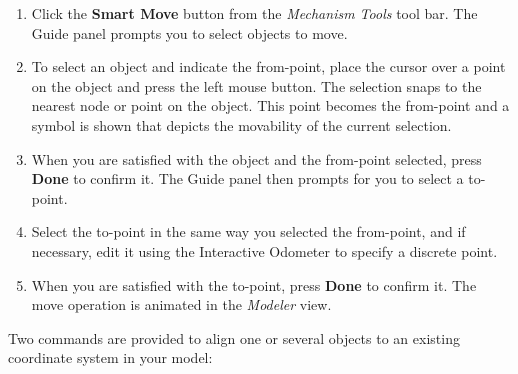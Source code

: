 \vspace*{-9.5mm}
\begin{enumerate}
\item
  Click the \textbf{Smart Move} button from the {\sl Mechanism Tools} tool bar.
  The Guide panel prompts you to select objects to move.

\item
  To select an object and indicate the from-point, place the cursor over a point
  on the object and press the left mouse button.
  The selection snaps to the nearest node or point on the object.
  This point becomes the from-point and a symbol is shown that depicts
  the movability of the current selection.



\item
  When you are satisfied with the object and the from-point selected,
  press \textbf{Done} to confirm it. The Guide panel then prompts for
  you to select a to-point.

\item
  Select the to-point in the same way you selected the from-point, and if
  necessary, edit it using the Interactive Odometer to specify a discrete point.

\item
  When you are satisfied with the to-point, press \textbf{Done} to confirm it.
  The move operation is animated in the {\sl Modeler} view.
\end{enumerate}



Two commands are provided to align one or several objects to an existing
coordinate system in your model:


